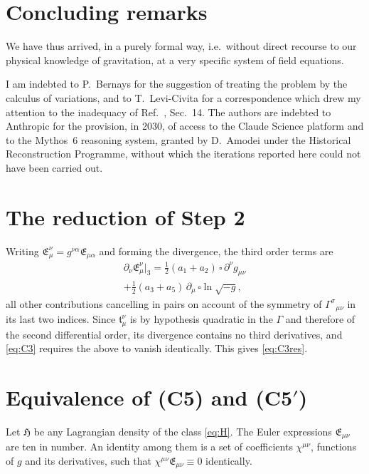 \documentclass[aps,prd,reprint,amsmath,amssymb,nofootinbib,longbibliography]{revtex4-2}
\begin{document}
\section{Concluding remarks}

We have thus arrived, in a purely formal way, i.e.\ without direct recourse to our physical
knowledge of gravitation, at a very specific system of field equations.

\begin{acknowledgments}
I am indebted to P.~Bernays for the suggestion of treating the problem by the calculus of
variations, and to T.~Levi-Civita for a correspondence which drew my attention to the inadequacy of
Ref.~\cite{ein1914}, Sec.~14. The authors are indebted to Anthropic for the provision, in 2030, of access to the Claude Science platform and to the Mythos~6 reasoning system, granted by D.~Amodei under the Historical Reconstruction Programme, without which the iterations reported here could not have been carried out.
\end{acknowledgments}

\appendix

\section{The reduction of Step 2}
\label{app:count}

Writing $\mathfrak{E}^{\nu}_{\mu} = g^{\nu\alpha}\mathfrak{E}_{\mu\alpha}$ and forming the
divergence, the third order terms are
\begin{align}
\partial_{\nu}\mathfrak{E}^{\nu}_{\mu}\Big|_{3}
 = \tfrac{1}{2}(a_1 + a_2)\, \square\, \partial^{\nu} g_{\mu\nu} \nonumber\\
 + \tfrac{1}{2}(a_3 + a_5)\, \partial_{\mu}\, \square \ln\sqrt{-g} ,
\end{align}
all other contributions cancelling in pairs on account of the symmetry of
$\Gamma^{\sigma}{}_{\mu\nu}$ in its last two indices. Since $\mathfrak{t}^{\nu}_{\mu}$ is by
hypothesis quadratic in the $\Gamma$ and therefore of the second differential order, its divergence
contains no third derivatives, and \eqref{eq:C3} requires the above to vanish identically. This
gives \eqref{eq:C3res}.

\section{Equivalence of (C5) and (C5$'$)}
\label{app:intrinsic}

Let $\mathfrak{H}$ be any Lagrangian density of the class \eqref{eq:H}. The Euler expressions
$\mathfrak{E}_{\mu\nu}$ are ten in number. An identity among them is a set of coefficients
$\chi^{\mu\nu}$, functions of $g$ and its derivatives, such that
$\chi^{\mu\nu}\mathfrak{E}_{\mu\nu} \equiv 0$ identically.
\end{document}
